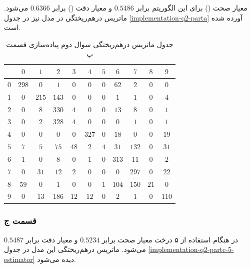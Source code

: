 \documentclass{article}
\begin{document}
معیار صحت () برای این الگوریتم برابر $0.5486$ و معیار دقت () برابر $0.6366$ می‌شود. ماتریس درهم‌ریختگی در
مدل نیز در جدول \ref{implementation-q2-parta} آورده شده است.

\begin{table}[h]
    \centering
    \caption{جدول ماتریس درهم‌ریختگی سوال دوم پیاده‌سازی قسمت ب}
    \label{implementation-q2-partb}
    \begin{tabular}{c||c|c|c|c|c|c|c|c|c|c}
        & $0$ & $1$ & $2$ & $3$ & $4$ & $5$ & $6$ & $7$ & $8$ & $9$ \\
        \hline\hline
        $0$ & $298$ & $0$ & $1$ & $0$ & $0$ & $0$ & $62$ & $2$ & $0$ & $0$ \\
        \hline
        $1$ & $0$ & $215$ & $143$ & $0$ & $0$ & $0$ & $1$ & $1$ & $0$ & $4$ \\
        \hline
        $2$ & $0$ & $8$ & $330$ & $4$ & $0$ & $0$ & $13$ & $8$ & $0$ & $1$ \\
        \hline
        $3$ & $0$ & $2$ & $328$ & $4$ & $0$ & $0$ & $0$ & $1$ & $0$ & $1$ \\
        \hline
        $4$ & $0$ & $0$ & $0$ & $0$ & $327$ & $0$ & $18$ & $0$ & $0$ & $19$ \\
        \hline
        $5$ & $7$ & $5$ & $75$ & $48$ & $2$ & $4$ & $31$ & $132$ & $0$ & $31$ \\
        \hline
        $6$ & $1$ & $0$ & $8$ & $0$ & $1$ & $0$ & $313$ & $11$ & $0$ & $2$ \\
        \hline
        $7$ & $0$ & $31$ & $12$ & $2$ & $0$ & $0$ & $0$ & $297$ & $0$ & $22$ \\
        \hline
        $8$ & $59$ & $0$ & $1$ & $0$ & $0$ & $1$ & $104$ & $150$ & $21$ & $0$ \\
        \hline
        $9$ & $0$ & $13$ & $186$ & $12$ & $12$ & $0$ & $2$ & $1$ & $0$ & $110$
    \end{tabular}
\end{table}

\subsubsection*{قسمت ج}

در هنگام استفاده از ۵ درخت معیار صحت برابر $0.5234$ و معیار دقت برابر $0.5487$ می‌شود. ماتریس درهم‌ریختگی این
مدل در جدول \ref{implementation-q2-partc-5-estimator} دیده می‌شود.
\end{document}

